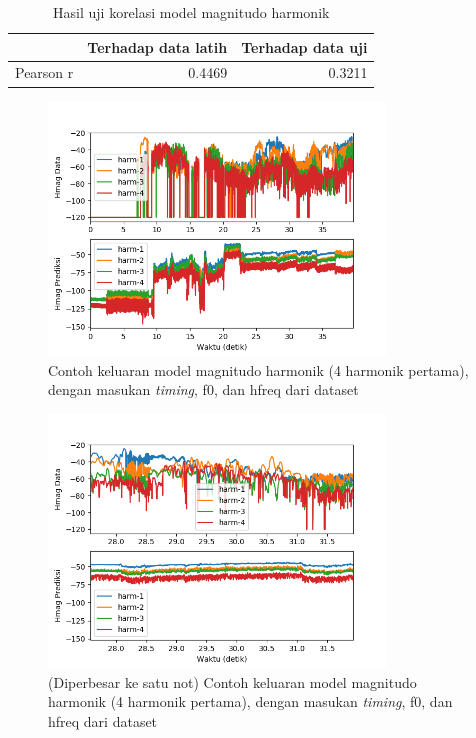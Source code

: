 \begin{table}[htbp]
    \centering
    \caption{Hasil uji korelasi model magnitudo harmonik}\label{tab-mag-testing-results}
    \begin{tabular}{ |l|r|r| } 
     \cline{2-3}
     \multicolumn{1}{l|}{}&Terhadap data latih&Terhadap data uji\\\hline
	 Pearson r&0.4469  &0.3211\\\hline
    \end{tabular}
\end{table}

\begin{figure}[htbp]
    \centering
    \includegraphics[width=0.8\textwidth]{resources/Analisis_Hmag.png}
    \caption{Contoh keluaran model magnitudo harmonik (4 harmonik pertama), dengan masukan \textit{timing}, f0, dan hfreq dari dataset}\label{fig-hmag-output-sample}
\end{figure}

\begin{figure}[htbp]
    \centering
    \includegraphics[width=0.8\textwidth]{resources/Analisis_Hmag_zoomed.png}
    \caption{(Diperbesar ke satu not) Contoh keluaran model magnitudo harmonik (4 harmonik pertama), dengan masukan \textit{timing}, f0, dan hfreq dari dataset}\label{fig-hmag-output-sample-zoomed}
\end{figure}

